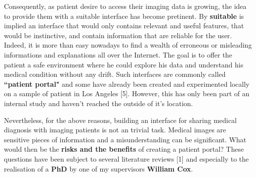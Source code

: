 \newline \vspace{5mm}
Consequently, as patient desire to access their imaging data is growing, the idea to provide them with a suitable interface has become pretinent. By \textbf{suitable} is implied an interface that would only contains relevant and useful features, that would be instinctive, and contain information  that are reliable for the user. Indeed, it is more than easy nowadays to find a wealth of erroneous or misleading informations and explanations all over the Internet. The goal is to offer the patient a safe environment where he could explore his data and understand his medical condition without any drift. Such interfaces are commonly called \textbf{``patient portal"} and some have already been created and experimented locally on a sample of patient in Los Angeles [5]. However, this has only been part of an internal study and haven't reached the outside of it's location.

\newline \vspace{5mm}
Nevertheless, for the above reasons, building an interface for sharing medical diagnosis with imaging patients is not an trivial task. Medical images are sensitive pieces of information and a misunderstanding can be significant. What would then be the \textbf{risks and the benefits} of creating a patient portal? These questions have been subject to several literature reviews [1] and especially to the realisation of a \textbf{PhD} by one of my supervisors \textbf{William Cox}.
